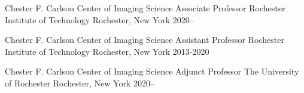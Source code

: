 
\begin{cventries}


    \cventry
    {Chester F. Carlson Center of Imaging Science}
    {Associate Professor}
    {Rochester Institute of Technology}
    {Rochester, New York}
    {2020--}

    \cventry
    {Chester F. Carlson Center of Imaging Science}
    {Assistant Professor}
    {Rochester Institute of Technology}
    {Rochester, New York}
    {2013-2020}

    \cventry
    {Chester F. Carlson Center of Imaging Science}
    {Adjunct Professor}
    {The University of Rochester}
    {Rochester, New York}
    {2020--}
    
    
\end{cventries}






